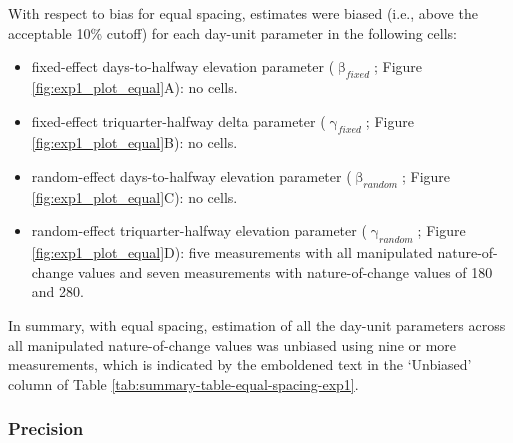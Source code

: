 \documentclass[
12pt, %
twoside,
english]{guelphthesis}
\begin{document}
With respect to bias for equal spacing, estimates were biased (i.e., above the acceptable 10\% cutoff) for each day-unit parameter in the following cells:
\begin{itemize}
\tightlist
\item
  fixed-effect days-to-halfway elevation parameter (\(\upbeta_{fixed}\); Figure \ref{fig:exp1_plot_equal}A): no cells.
\item
  fixed-effect triquarter-halfway delta parameter (\(\upgamma_{fixed}\); Figure \ref{fig:exp1_plot_equal}B): no cells.
\item
  random-effect days-to-halfway elevation parameter (\(\upbeta_{random}\); Figure \ref{fig:exp1_plot_equal}C): no cells.
\item
  random-effect triquarter-halfway elevation parameter (\(\upgamma_{random}\); Figure \ref{fig:exp1_plot_equal}D): five measurements with all manipulated nature-of-change values and seven measurements with nature-of-change values of 180 and 280.
\end{itemize}
In summary, with equal spacing, estimation of all the day-unit parameters across all manipulated nature-of-change values was unbiased using nine or more measurements, which is indicated by the emboldened text in the `Unbiased' column of Table \ref{tab:summary-table-equal-spacing-exp1}.

\hypertarget{precision-equal-exp1}{%
\subsubsection{Precision}\label{precision-equal-exp1}}
\end{document}
